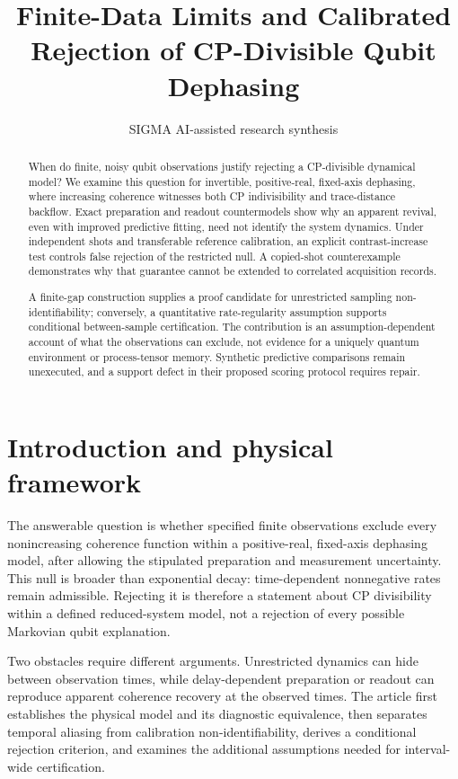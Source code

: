 \documentclass[11pt]{article}
\title{Finite-Data Limits and Calibrated Rejection of CP-Divisible Qubit Dephasing}
\date{}
\author{SIGMA AI-assisted research synthesis}
\begin{document}
\maketitle
\begin{center}\end{center}

\begin{abstract}
When do finite, noisy qubit observations justify rejecting a CP-divisible dynamical model? We examine this question for invertible, positive-real, fixed-axis dephasing, where increasing coherence witnesses both CP indivisibility and trace-distance backflow. Exact preparation and readout countermodels show why an apparent revival, even with improved predictive fitting, need not identify the system dynamics. Under independent shots and transferable reference calibration, an explicit contrast-increase test controls false rejection of the restricted null. A copied-shot counterexample demonstrates why that guarantee cannot be extended to correlated acquisition records.

A finite-gap construction supplies a proof candidate for unrestricted sampling non-identifiability; conversely, a quantitative rate-regularity assumption supports conditional between-sample certification. The contribution is an assumption-dependent account of what the observations can exclude, not evidence for a uniquely quantum environment or process-tensor memory. Synthetic predictive comparisons remain unexecuted, and a support defect in their proposed scoring protocol requires repair.
\end{abstract}
\section{Introduction and physical framework}
The answerable question is whether specified finite observations exclude every nonincreasing coherence function within a positive-real, fixed-axis dephasing model, after allowing the stipulated preparation and measurement uncertainty. This null is broader than exponential decay: time-dependent nonnegative rates remain admissible. Rejecting it is therefore a statement about CP divisibility within a defined reduced-system model, not a rejection of every possible Markovian qubit explanation.

Two obstacles require different arguments. Unrestricted dynamics can hide between observation times, while delay-dependent preparation or readout can reproduce apparent coherence recovery at the observed times. The article first establishes the physical model and its diagnostic equivalence, then separates temporal aliasing from calibration non-identifiability, derives a conditional rejection criterion, and examines the additional assumptions needed for interval-wide certification.
\end{document}
